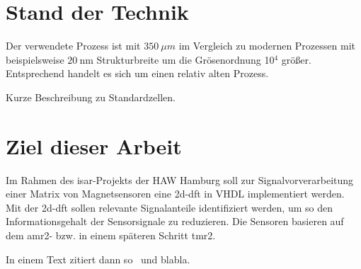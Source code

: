 \section{Stand der Technik}
Der verwendete Prozess ist mit $\SI{350}{\mu m}$ im Vergleich zu modernen Prozessen mit beispielsweise $\SI{20}{\nm}$ Strukturbreite um die Grösenordnung 10$^4$ größer. Entsprechend handelt es 
sich um einen relativ alten Prozess.

Kurze Beschreibung zu Standardzellen.


\section{Ziel dieser Arbeit}
Im Rahmen des \gls{isar}-Projekts der HAW Hamburg soll zur Signalvorverarbeitung einer Matrix von Magnetsensoren  eine \gls{2d-dft} in VHDL implementiert werden. Mit der 
\gls{2d-dft} sollen relevante Signalanteile identifiziert werden, um so den Informationsgehalt der Sensorsignale zu reduzieren. Die Sensoren basieren auf dem \gls{amr2}- 
bzw. in einem späteren Schritt \gls{tmr2}.

In einem Text zitiert dann so~\autocite[10-20]{krey2015systemarchitektur} und blabla.